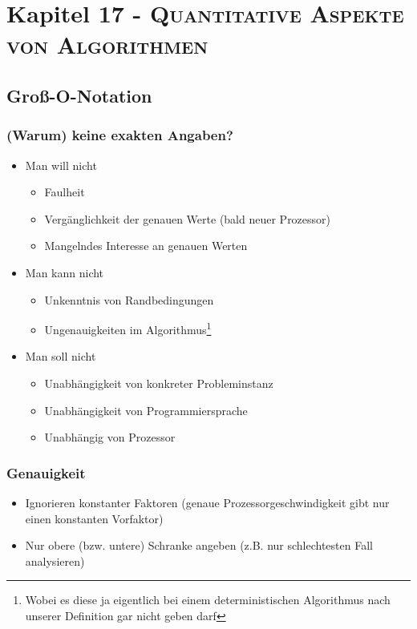 \documentclass{article}
\newcommand{\kapitel}[2]{Kapitel #1 - \textsc{#2}}
\newcommand{\anfuehrung}[1]{\flqq #1\frqq}
\begin{document}
\newpage
\section{\kapitel{17}{Quantitative Aspekte von Algorithmen}}
\subsection{Groß-O-Notation}
\subsubsection{(Warum) keine exakten Angaben?}
\begin{itemize}
    \item Man will nicht
    \begin{itemize}
        \item Faulheit
        \item Vergänglichkeit der genauen Werte (bald neuer Prozessor)
        \item Mangelndes Interesse an genauen Werten
    \end{itemize}
    \item Man kann nicht
    \begin{itemize}
        \item Unkenntnis von Randbedingungen
        \item Ungenauigkeiten im \anfuehrung{Algorithmus}\footnote{Wobei es diese ja eigentlich bei einem deterministischen Algorithmus nach unserer Definition gar nicht geben darf}    
    \end{itemize}
    \item Man \anfuehrung{soll} nicht
    \begin{itemize}
        \item Unabhängigkeit von konkreter Probleminstanz
        \item Unabhängigkeit von Programmiersprache
        \item Unabhängig von Prozessor
    \end{itemize}
\end{itemize}

\subsubsection{Genauigkeit}
\begin{itemize}
    \item Ignorieren konstanter Faktoren (genaue Prozessorgeschwindigkeit gibt nur einen konstanten Vorfaktor)
    \item Nur obere (bzw. untere) Schranke angeben (z.B. nur schlechtesten Fall analysieren)
\end{itemize}
\end{document}

